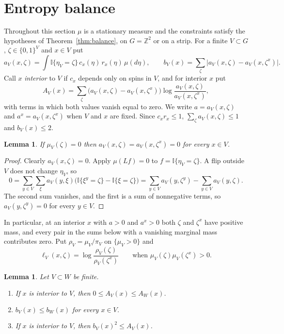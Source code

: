 \documentclass[11pt]{amsart}
\newtheorem{lemma}[theorem]{Lemma}
\theoremstyle{remark}
\newcommand{\Z}{\mathbb{Z}}
\begin{document}
\section{Entropy balance}\label{sec:entropy}

Throughout this section $\mu$ is a stationary measure and the constraints satisfy the hypotheses of
Theorem~\ref{thm:balance}, on $G=\Z^2$ or on a strip. For a finite $V\subset G$, $\zeta\in\{0,1\}^V$ and $x\in V$ put
\[
a_V(x,\zeta)=\int\mathbb I\{\eta_V=\zeta\}\,c_x(\eta)\,r_x(\eta)\,\mu(d\eta),\qquad
b_V(x)=\sum_{\zeta}\bigl|a_V(x,\zeta)-a_V(x,\zeta^x)\bigr|.
\]
Call $x$ \emph{interior} to $V$ if $c_x$ depends only on spins in $V$, and for interior $x$ put
\[
A_V(x)=\sum_\zeta\bigl(a_V(x,\zeta)-a_V(x,\zeta^x)\bigr)\log\frac{a_V(x,\zeta)}{a_V(x,\zeta^x)},
\]
with terms in which both values vanish equal to zero. We write $a=a_V(x,\zeta)$ and $a^x=a_V(x,\zeta^x)$ when $V$ and
$x$ are fixed. Since $c_xr_x\le1$, $\sum_\zeta a_V(x,\zeta)\le1$ and $b_V(x)\le2$.

\begin{lemma}\label{lem:zero}
If $\mu_V(\zeta)=0$ then $a_V(x,\zeta)=a_V(x,\zeta^x)=0$ for every $x\in V$.
\end{lemma}

\begin{proof}
Clearly $a_V(x,\zeta)=0$. Apply $\mu(Lf)=0$ to $f=\mathbb I\{\eta_V=\zeta\}$. A flip outside $V$ does not change
$\eta_V$, so
\[
0=\sum_{y\in V}\sum_{\xi}a_V(y,\xi)\bigl(\mathbb I\{\xi^y=\zeta\}-\mathbb I\{\xi=\zeta\}\bigr)
=\sum_{y\in V}a_V(y,\zeta^y)-\sum_{y\in V}a_V(y,\zeta).
\]
The second sum vanishes, and the first is a sum of nonnegative terms, so $a_V(y,\zeta^y)=0$ for every $y\in V$.
\end{proof}

In particular, at an interior $x$ with $a>0$ and $a^x>0$ both $\zeta$ and $\zeta^x$ have positive mass, and every
pair in the sums below with a vanishing marginal mass contributes zero. Put $\rho_V=\mu_V/\pi_V$ on
$\{\mu_V>0\}$ and
\[
\ell_V(x,\zeta)=\log\frac{\rho_V(\zeta)}{\rho_V(\zeta^x)}\qquad\text{when }\mu_V(\zeta)\mu_V(\zeta^x)>0 .
\]

\begin{lemma}\label{lem:abc}
Let $V\subset W$ be finite.
\begin{enumerate}
\item[(a)] If $x$ is interior to $V$, then $0\le A_V(x)\le A_W(x)$.
\item[(b)] $b_V(x)\le b_W(x)$ for every $x\in V$.
\item[(c)] If $x$ is interior to $V$, then $b_V(x)^2\le A_V(x)$.
\end{enumerate}
\end{lemma}
\end{document}
